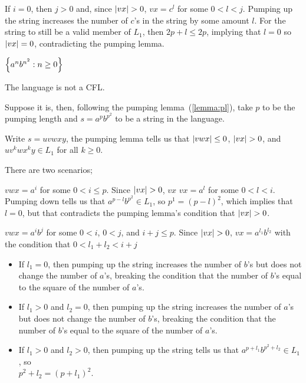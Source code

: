 \begin{problem}
\begin{enumalph}
\begin{Answer}
\begin{enumroman}
        \step
        If $i = 0$, then $j > 0$ and, since $\lvert vx\rvert > 0$, $vx = c^l$ for some
        $0 < l < j$.
        Pumping up the string increases the number of $c$'s in the string by some
        amount $l$. For the string to still be a valid member of $L_1$,
        then $2p + l \leq 2p$, implying that $l = 0$ so $\lvert vx\rvert = 0$,
        contradicting the pumping lemma.
        
      \end{enumroman}

    \end{Answer}
    \item $\left\{a^n b^{n^2} : n \ge 0\right\}$
    \begin{Answer}
      The language is not a CFL.

      Suppose it is, then, following the pumping lemma~(\ref{lemma:pl}),
      take $p$ to be the pumping length and $s = a^pb^{p^2}$
      to be a string in the language.

      Write $s = uvwxy$, the pumping lemma tells us that $\lvert vwx\rvert \leq 0$,
      $\lvert vx\rvert > 0$, and $uv^kwx^ky \in L_1$ for all $k \geq 0$.

      There are two scenarios;
      \begin{enumroman}
        \item $vwx = a^i$ for some $0 < i \leq p$.
          Since $\lvert vx\rvert > 0$, $vx$ $vx = a^l$ for some $0 < l < i$.
          Pumping down tells us that $a^{p-l}b^{p^2} \in L_1$,
          so $p^1 = (p - l)^2$, which implies that $l = 0$,
          but that contradicts the pumping lemma's condition that
          $\lvert vx\rvert > 0$.
        \item $vwx = a^ib^j$ for some $0 < i$, $0 < j$, and $i + j \leq p$.
          Since $\lvert vx\rvert > 0$, $vx = a^{l_1}b^{l_2}$ with the condition
          that $0 < l_1 + l_2 < i + j$
          
          \begin{itemize}
            \item If $l_1 = 0$, then pumping up the string increases the number of $b$'s
              but does not change the number of $a$'s, breaking the condition
              that the number of $b$'s equal to the square of the number of $a$'s.
            \item If $l_1 > 0$ and $l_2 = 0$, then pumping up the string
              increases the number of $a$'s but does not change the number of $b$'s,
              breaking the condition that the number of $b$'s equal to the square
              of the number of $a$'s.
            \item If $l_1 > 0$ and $l_2 > 0$, then pumping up the string tells us that
              $a^{p+l_1}b^{p^2+l_2} \in L_1$, so \\ $p^2 + l_2 = (p + l_1)^2$.
    

\end{itemize}
\end{enumroman}
\end{Answer}
\end{enumalph}
\end{problem}
